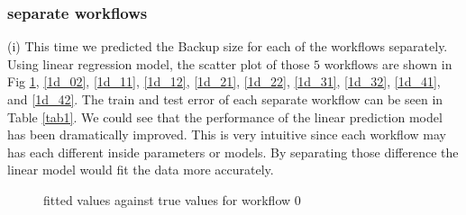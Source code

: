 \documentclass{article}
\begin{document}
\subsubsection{separate workflows}

(i) This time we predicted the Backup size for each of the workflows separately. Using linear regression model, the scatter plot of those $5$ workflows are shown in Fig \ref{1d_01}, \ref{1d_02}, \ref{1d_11}, \ref{1d_12}, \ref{1d_21}, \ref{1d_22}, \ref{1d_31}, \ref{1d_32}, \ref{1d_41}, and \ref{1d_42}. The train and test error of each separate workflow can be seen in Table \ref{tab1}. We could see that the performance of the linear prediction model has been dramatically improved. This is very intuitive since each workflow may has each different inside parameters or models. By separating those difference the linear model would fit the data more accurately. 

\begin{table}[h]
\center
\caption{Train and test RMSE}
\label{tab1}
\end{table}

\begin{figure}[!htbp]
\centering
{}
\caption{fitted values against true values for workflow $0$} \label{1d_01}
\end{figure}
\end{document}
